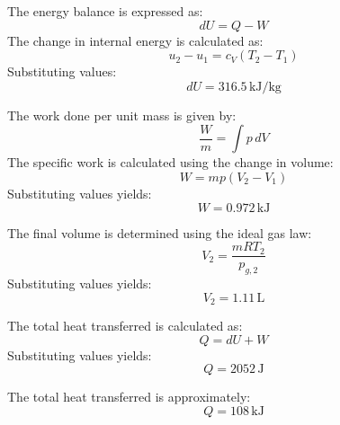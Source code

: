 The energy balance is expressed as:  
\[
dU = Q - W
\]  
The change in internal energy is calculated as:  
\[
u_2 - u_1 = c_V (T_2 - T_1)
\]  
Substituting values:  
\[
dU = 316.5 \, \text{kJ/kg}
\]  

The work done per unit mass is given by:  
\[
\frac{W}{m} = \int p \, dV
\]  
The specific work is calculated using the change in volume:  
\[
W = m p (V_2 - V_1)
\]  
Substituting values yields:  
\[
W = 0.972 \, \text{kJ}
\]  

The final volume is determined using the ideal gas law:  
\[
V_2 = \frac{m R T_2}{p_{g,2}}
\]  
Substituting values yields:  
\[
V_2 = 1.11 \, \text{L}
\]  

The total heat transferred is calculated as:  
\[
Q = dU + W
\]  
Substituting values yields:  
\[
Q = 2052 \, \text{J}
\]  

The total heat transferred is approximately:  
\[
Q = 108 \, \text{kJ}
\]